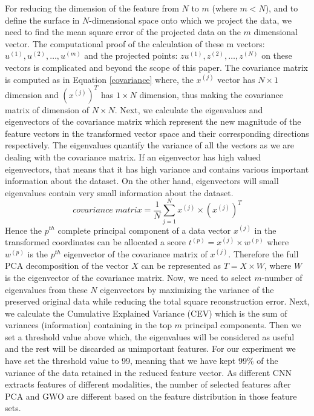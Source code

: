 \documentclass{llncs}
\begin{document}
For reducing the dimension of the feature from $N$ to $m$ (where $m<N$), and to define the surface in $N$-dimensional space onto which we project the data, we need to find the mean square error of the projected data on the $m$ dimensional vector. The computational proof of the calculation of these m vectors: $u^{(1)}, u^{(2)},\hdots,u^{(m)}$ and the projected points: $zu^{(1)}, z^{(2)},\hdots,z^{(N)}$ on these vectors is complicated and beyond the scope of this paper. The covariance matrix is computed as in Equation \ref{covariance} where, the $x^{(j)}$ vector has $N\times1$ dimension and $(x^{(j)})^T$ has $1\times N$ dimension, thus making the covariance matrix of dimension of $N\times N$. Next, we calculate the eigenvalues and eigenvectors of the covariance matrix which represent the new magnitude of the feature vectors in the transformed vector space and their corresponding directions respectively.  The eigenvalues quantify the variance of all the vectors as we are dealing with the covariance matrix. If an eigenvector has high valued eigenvectors, that means that it has high variance and contains various important information about the dataset. On the other hand, eigenvectors will small eigenvalues contain very small information about the dataset.
\begin{equation}\label{covariance}
    covariance\;matrix = \frac{1}{N}\sum_{j=1}^{N}x^{(j)}\times (x^{(j)})^T
\end{equation}
Hence the $p^{th}$ complete principal component of a data vector $x^{(j)}$ in the transformed coordinates can be allocated a score $t^{(p)} = x^{(j)}\times w^{(p)}$ where $w^{(p)}$ is the $p^{th}$ eigenvector of the covariance matrix of $x^{(j)}$. Therefore the full PCA decomposition of the vector $X$ can be represented as $T=X\times W$, where $W$ is the eigenvector of the covariance matrix. Now, we need to select $m$-number of eigenvalues from these $N$ eigenvectors by maximizing the variance of the preserved original data while reducing the total square reconstruction error. Next, we calculate the Cumulative Explained Variance (CEV) which is the sum of variances (information) containing in the top $m$ principal components. Then we set a threshold value above which, the eigenvalues will be considered as useful and the rest will be discarded as unimportant features. For our experiment we have set the threshold value to 99, meaning that we have kept 99\% of the variance of the data retained in the reduced feature vector. As different CNN extracts features of different modalities, the number of selected features after PCA and GWO are different based on the feature distribution in those feature sets. 
\end{document}
